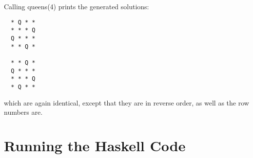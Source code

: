 Calling queens(4) prints the generated solutions:
\begin{verbatim}
  * Q * * 
  * * * Q 
  Q * * * 
  * * Q * 
  
  * * Q * 
  Q * * * 
  * * * Q 
  * Q * *
\end{verbatim}
which are again identical, except that they are in reverse order, as well as the row numbers are.

\section{Running the Haskell Code}

